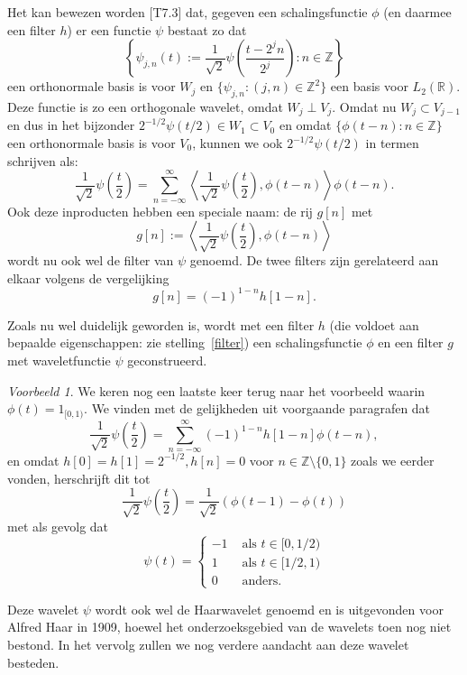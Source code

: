 \documentclass[11pt]{report}
\theoremstyle{plain}
\theoremstyle{definition}
\theoremstyle{remark}
\newtheorem*{voorbeeld}{Voorbeeld}
\newcommand{\R}{\mathbb{R}}
\newcommand{\Z}{\mathbb{Z}}
\begin{document}
Het kan bewezen worden \cite{mallat}[T7.3] dat, gegeven een schalingsfunctie $\phi$ (en daarmee een filter $h$) er een functie $\psi$ bestaat zo dat 
\[
	\left\{ \psi_{j,n}(t) := \frac{1}{\sqrt{2}} \psi\left(\frac{t-2^jn}{2^j}\right) : n \in \Z \right\}
\] een orthonormale basis is voor $W_j$ en $\{ \psi_{j,n}: (j,n) \in \Z^2 \}$ een basis voor $L_2(\R)$. Deze functie is zo een orthogonale wavelet, omdat $W_j \perp V_j$.
Omdat nu $W_j \subset V_{j-1}$ en dus in het bijzonder $2^{-1/2} \psi(t/2) \in W_1 \subset V_0$ en omdat $\{ \phi(t-n): n \in \Z \}$ een orthonormale basis is voor $V_0$, kunnen we ook $2^{-1/2}\psi(t/2)$ in termen schrijven als:
\[
	\frac{1}{\sqrt{2}} \psi\left(\frac{t}{2}\right) = \sum_{n=-\infty}^{\infty} \left\langle \frac{1}{\sqrt{2}} \psi\left(\frac{t}{2}\right), \phi(t-n) \right\rangle \phi(t-n).
\]
Ook deze inproducten hebben een speciale naam: de rij $g[n]$ met
\[
	g[n] := \left\langle \frac{1}{\sqrt{2}} \psi\left(\frac{t}{2}\right), \phi(t-n) \right\rangle
\]
wordt nu ook wel de filter van $\psi$ genoemd. De twee filters zijn gerelateerd aan elkaar volgens de vergelijking
\[
	g[n] = (-1)^{1-n}h[1-n].
\]

Zoals nu wel duidelijk geworden is, wordt met een filter $h$ (die voldoet aan bepaalde eigenschappen: zie stelling~\ref{filter}) een schalingsfunctie $\phi$ en een filter $g$ met waveletfunctie $\psi$ geconstrueerd.

\begin{voorbeeld}
We keren nog een laatste keer terug naar het voorbeeld waarin $\phi(t) = 1_{[0,1)}$. We vinden met de gelijkheden uit voorgaande paragrafen dat
\[
\frac{1}{\sqrt{2}} \psi\left(\frac{t}{2}\right) = \sum_{n=-\infty}^{\infty} (-1)^{1-n}h[1-n] \phi(t-n),
\]
en omdat $h[0] = h[1] = 2^{-1/2}, h[n] = 0$ voor $n \in \Z \setminus \{0,1\}$ zoals we eerder vonden, herschrijft dit tot
\[
\frac{1}{\sqrt{2}} \psi\left(\frac{t}{2}\right) = \frac{1}{\sqrt{2}}\left(\phi(t-1) - \phi(t)\right)
\]
met als gevolg dat
\[
	\psi(t) = \begin{cases} -1 & \text{ als } t \in [0,1/2) \\ 1 & \text{ als } t \in [1/2,1) \\ 0 & \text{ anders.} \end{cases}
\]

Deze wavelet $\psi$ wordt ook wel de Haarwavelet genoemd en is uitgevonden voor Alfred Haar in 1909, hoewel het onderzoeksgebied van de wavelets toen nog niet bestond. In het vervolg zullen we nog verdere aandacht aan deze wavelet besteden.
\end{voorbeeld}
\end{document}
